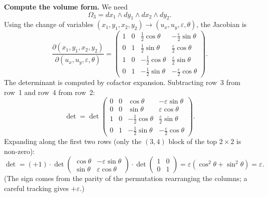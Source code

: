 \textbf{Compute the volume form.} We need
\[
\Omega_3 = dx_1\wedge dy_1\wedge dx_2\wedge dy_2.
\]
Using the change of variables $(x_1,y_1,x_2,y_2) \to (u_x,u_y,\varepsilon,\theta)$, the Jacobian is
\[
\frac{\partial(x_1,y_1,x_2,y_2)}{\partial(u_x,u_y,\varepsilon,\theta)} = \begin{pmatrix} 1 & 0 & \frac{1}{2}\cos\theta & -\frac{\varepsilon}{2}\sin\theta \\ 0 & 1 & \frac{1}{2}\sin\theta & \frac{\varepsilon}{2}\cos\theta \\ 1 & 0 & -\frac{1}{2}\cos\theta & \frac{\varepsilon}{2}\sin\theta \\ 0 & 1 & -\frac{1}{2}\sin\theta & -\frac{\varepsilon}{2}\cos\theta \end{pmatrix}.
\]
The determinant is computed by cofactor expansion. Subtracting row~3 from row~1 and row~4 from row~2:
\[
\det = \det\begin{pmatrix} 0 & 0 & \cos\theta & -\varepsilon\sin\theta \\ 0 & 0 & \sin\theta & \varepsilon\cos\theta \\ 1 & 0 & -\frac{1}{2}\cos\theta & \frac{\varepsilon}{2}\sin\theta \\ 0 & 1 & -\frac{1}{2}\sin\theta & -\frac{\varepsilon}{2}\cos\theta \end{pmatrix}.
\]
Expanding along the first two rows (only the $(3,4)$ block of the top $2\times 2$ is non-zero):
\[
\det = (+1)\cdot\det\begin{pmatrix}\cos\theta & -\varepsilon\sin\theta \\ \sin\theta & \varepsilon\cos\theta\end{pmatrix}\cdot\det\begin{pmatrix}1 & 0\\ 0 & 1\end{pmatrix} = \varepsilon(\cos^2\theta + \sin^2\theta) = \varepsilon.
\]
(The sign comes from the parity of the permutation rearranging the columns; a careful tracking gives $+\varepsilon$.)

